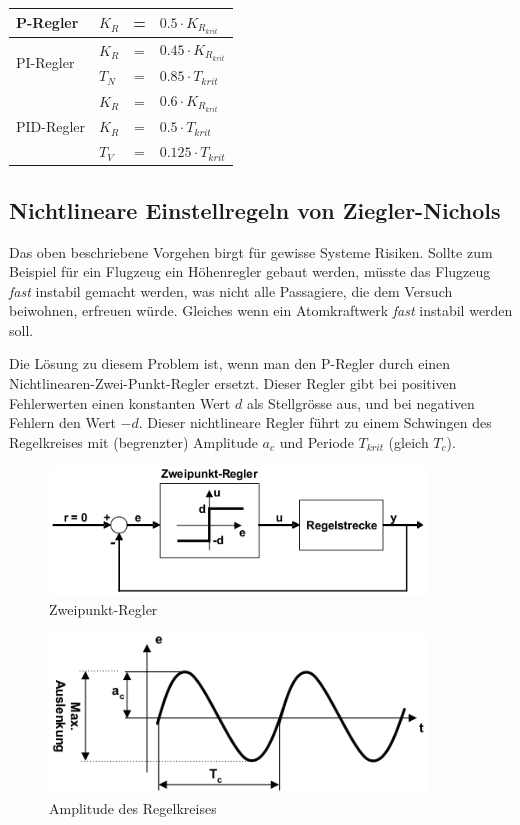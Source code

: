 \documentclass[a4paper,10pt,oneside]{article}
\begin{document}
\begin{center}
\begin{tabular}{|l| l  c l|}
\hline
P-Regler & $K_R$ &  = & $ 0.5 \cdot K_{R_{krit}}$ \\ \hline\hline
\multirow{2}{*}{PI-Regler} &  $K_R$ &  = & $ 0.45 \cdot K_{R_{krit}}$ \\ \cline{2-4}
 & $T_N$ & = & $0.85 \cdot T_{krit}$ \\ \hline\hline
\multirow{3}{*}{PID-Regler} & $K_R$ &  = & $ 0.6 \cdot K_{R_{krit}}$ \\ \cline{2-4}
 &  $K_R$ &  = & $ 0.5 \cdot T_{krit}$ \\ \cline{2-4}
  & $T_V$ & = & $0.125 \cdot T_{krit}$ \\ \hline
\end{tabular}
\end{center}


\subsection{Nichtlineare Einstellregeln von Ziegler-Nichols}

Das oben beschriebene Vorgehen birgt für gewisse Systeme Risiken. Sollte zum Beispiel für ein Flugzeug ein Höhenregler gebaut werden, müsste das Flugzeug \textit{fast} instabil gemacht werden, was nicht alle Passagiere, die dem Versuch beiwohnen, erfreuen würde. Gleiches wenn ein Atomkraftwerk \textit{fast} instabil werden soll.

Die Lösung zu diesem Problem ist, wenn man den P-Regler durch einen Nichtlinearen-Zwei-Punkt-Regler ersetzt. Dieser Regler gibt bei positiven Fehlerwerten einen konstanten Wert $d$ als Stellgrösse aus, und bei negativen Fehlern den Wert $-d$. Dieser nichtlineare Regler führt zu einem Schwingen des Regelkreises mit (begrenzter) Amplitude $a_c$  und Periode $T_{krit}$ (gleich $T_c$). 


\begin{figure}[H]
\centering
\includegraphics[width=10cm]{img/zweipunkt.eps}
\caption{Zweipunkt-Regler}
\label{2punkt}
\end{figure}


\begin{figure}[H]
\centering
\includegraphics[width= 10cm]{img/amplitude.eps}
\caption{Amplitude des Regelkreises}
\label{ampli}
\end{figure}
\end{document}
